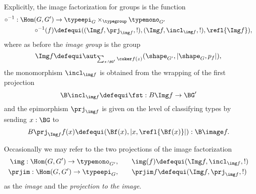 \begin{definition}
  \label{def:image}
Explicitly, the image factorization for groups is the function
\begin{align*}
\circ^{-1}:\Hom(G,G')&\to\typeepi_G\times_{\typegroup}\typemono_{G'}\\
\circ^{-1}(f)&\defequi ((\Img f,\prj_{\img f},!),(\Img f,\incl_{\img f},!),\refl{\Img f}),
\end{align*}
    where as before the \emph{image group} is the group
    $$\Img f\defequi \aut_{\sum_{z:\BG'}\coker f(z)}(\shape_{G'},|\shape_G,p_f|),$$
    the monomorphism $\incl_{\img f}$ is obtained from the wrapping of the first projection
    $$\B\incl_{\img f}\defequi\fst: B\Img f\to \BG'$$
    and
the epimorphism
  $\prj_{\img f}$  is given on the level of classifying types by sending $x:\BG$ to
  $$B\prj_{\Img f} f(x)\defequi (\Bf(x),|x,\refl{\Bf(x)}|):\B\image f.$$

    
 Occasionally we may refer to the two projections of the image factorization
 \begin{align*}
    \img:\Hom(G,G')\to\typemono_{G'},\qquad&\img(f)\defequi(\Img f,\incl_{\img f},!)\\
 \prjim:\Hom(G,G')\to\typeepi_G, \qquad&\prjim f\defequi(\Img f,\prj_{\img f},!)
  \end{align*}
  as the \emph{image} and the \emph{projection to the image}.
\end{definition}


